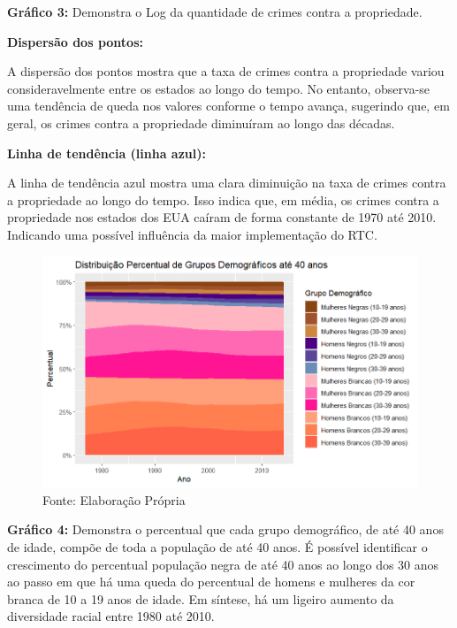 \documentclass[12pt]{article}
\begin{document}
\textbf{Gráfico 3:} Demonstra o Log da quantidade de crimes contra a
propriedade.

\textbf{Dispersão dos pontos:}

A dispersão dos pontos mostra que a taxa de crimes contra a propriedade
variou consideravelmente entre os estados ao longo do tempo. No entanto,
observa-se uma tendência de queda nos valores conforme o tempo avança,
sugerindo que, em geral, os crimes contra a propriedade diminuíram ao
longo das décadas.

\textbf{Linha de tendência (linha azul):}

A linha de tendência azul mostra uma clara diminuição na taxa de crimes
contra a propriedade ao longo do tempo. Isso indica que, em média, os
crimes contra a propriedade nos estados dos EUA caíram de forma
constante de 1970 até 2010. Indicando uma possível influência da maior
implementação do RTC.

\begin{figure}[H]
    \centering
    \includegraphics[width=1\linewidth]{grafico4final.png}
    \caption{Fonte: Elaboração Própria}
    \label{fig:enter-label}
\end{figure}

\textbf{Gráfico 4:} Demonstra o percentual que cada grupo demográfico,
de até 40 anos de idade, compõe de toda a população de até 40 anos. É
possível identificar o crescimento do percentual população negra de até
40 anos ao longo dos 30 anos ao passo em que há uma queda do percentual
de homens e mulheres da cor branca de 10 a 19 anos de idade. Em síntese,
há um ligeiro aumento da diversidade racial entre 1980 até 2010.
\end{document}
